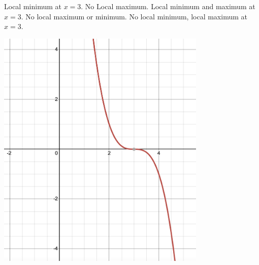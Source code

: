 \documentclass[addpoints, 12pt]{exam}%
\begin{document}
\begin{questions}
\begin{minipage}{0.5\textwidth}\vspace*{2pt}
\begin{choices}
\choice Local minimum at $x = 3$. No Local maximum.\vspace*{10pt}
\choice Local minimum and maximum at $x = 3$.\vspace*{10pt}
\CorrectChoice No local maximum or minimum.\vspace*{10pt}
\choice No local minimum, local maximum at $x = 3$.\vspace*{10pt}
\end{choices}
\end{minipage}
\hspace*{1cm}
\begin{minipage}{0.45\textwidth}
\includegraphics[width=0.75\textwidth]{HW4-graph1.png}
\end{minipage}


\end{questions}
\end{document}
